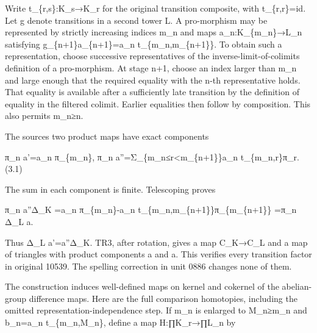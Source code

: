 \documentclass[11pt]{article}
\begin{document}
Write t\_\allowbreak{}\{r,\allowbreak{}s\}:\allowbreak{}K\_\allowbreak{}s\allowbreak{}→K\_\allowbreak{}r for the original transition composite,\allowbreak{} with t\_\allowbreak{}\{r,\allowbreak{}r\}\allowbreak{}=id. Let g denote transitions in a second tower L. A pro-morphism may be represented by strictly increasing indices m\_\allowbreak{}n and maps a\_\allowbreak{}n:\allowbreak{}K\_\allowbreak{}\{m\_\allowbreak{}n\}\allowbreak{}→L\_\allowbreak{}n satisfying g\_\allowbreak{}\{n\allowbreak{}+1\}a\_\allowbreak{}\{n\allowbreak{}+1\}\allowbreak{}=a\_\allowbreak{}n t\_\allowbreak{}\{m\_\allowbreak{}n,\allowbreak{}m\_\allowbreak{}\{n\allowbreak{}+1\}\}. To obtain such a representation,\allowbreak{} choose successive representatives of the inverse-limit-of-colimits definition of a pro-morphism. At stage n\allowbreak{}+1,\allowbreak{} choose an index larger than m\_\allowbreak{}n and large enough that the required equality with the n-th representative holds. That equality is available after a sufficiently late transition by the definition of equality in the filtered colimit. Earlier equalities then follow by composition. This also permits m\_\allowbreak{}n≥n.

The source\textquotesingle s two product maps have exact components

π\_\allowbreak{}n a'\allowbreak{}=a\_\allowbreak{}n π\_\allowbreak{}\{m\_\allowbreak{}n\},\allowbreak{} π\_\allowbreak{}n a''\allowbreak{}=Σ\_\allowbreak{}\{m\_\allowbreak{}n≤r<m\_\allowbreak{}\{n\allowbreak{}+1\}\}a\_\allowbreak{}n t\_\allowbreak{}\{m\_\allowbreak{}n,\allowbreak{}r\}π\_\allowbreak{}r. (3.1)\allowbreak{}

The sum in each component is finite. Telescoping proves

π\_\allowbreak{}n a''Δ\_\allowbreak{}K \allowbreak{}=a\_\allowbreak{}n π\_\allowbreak{}\{m\_\allowbreak{}n\}-a\_\allowbreak{}n t\_\allowbreak{}\{m\_\allowbreak{}n,\allowbreak{}m\_\allowbreak{}\{n\allowbreak{}+1\}\}π\_\allowbreak{}\{m\_\allowbreak{}\{n\allowbreak{}+1\}\} \allowbreak{}=π\_\allowbreak{}n Δ\_\allowbreak{}L a\textquotesingle.

Thus Δ\_\allowbreak{}L a'\allowbreak{}=a''Δ\_\allowbreak{}K. TR3,\allowbreak{} after rotation,\allowbreak{} gives a map C\_\allowbreak{}K\allowbreak{}→C\_\allowbreak{}L and a map of triangles with product components a\textquotesingle{} and a\textquotesingle\textquotesingle. This verifies every transition factor in original 10539. The spelling correction in unit 0886 changes none of them.

The construction induces well-defined maps on kernel and cokernel of the abelian-group difference maps. Here are the full comparison homotopies,\allowbreak{} including the omitted representation-independence step. If m\_\allowbreak{}n is enlarged to M\_\allowbreak{}n≥m\_\allowbreak{}n and b\_\allowbreak{}n\allowbreak{}=a\_\allowbreak{}n t\_\allowbreak{}\{m\_\allowbreak{}n,\allowbreak{}M\_\allowbreak{}n\},\allowbreak{} define a map H:\allowbreak{}∏K\_\allowbreak{}r\allowbreak{}→∏L\_\allowbreak{}n by
\end{document}
